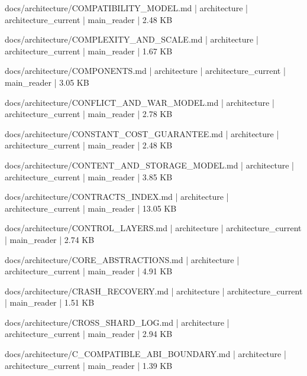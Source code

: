 \documentclass[11pt,a4paper]{report}
\begin{document}
{\small\ttfamily\raggedright docs/\allowbreak{}architecture/\allowbreak{}COMPATIBILITY\_MODEL.\allowbreak{}md | architecture | architecture\_current | main\_reader | 2.\allowbreak{}48 KB\par}
{\small\ttfamily\raggedright docs/\allowbreak{}architecture/\allowbreak{}COMPLEXITY\_AND\_SCALE.\allowbreak{}md | architecture | architecture\_current | main\_reader | 1.\allowbreak{}67 KB\par}
{\small\ttfamily\raggedright docs/\allowbreak{}architecture/\allowbreak{}COMPONENTS.\allowbreak{}md | architecture | architecture\_current | main\_reader | 3.\allowbreak{}05 KB\par}
{\small\ttfamily\raggedright docs/\allowbreak{}architecture/\allowbreak{}CONFLICT\_AND\_WAR\_MODEL.\allowbreak{}md | architecture | architecture\_current | main\_reader | 2.\allowbreak{}78 KB\par}
{\small\ttfamily\raggedright docs/\allowbreak{}architecture/\allowbreak{}CONSTANT\_COST\_GUARANTEE.\allowbreak{}md | architecture | architecture\_current | main\_reader | 2.\allowbreak{}48 KB\par}
{\small\ttfamily\raggedright docs/\allowbreak{}architecture/\allowbreak{}CONTENT\_AND\_STORAGE\_MODEL.\allowbreak{}md | architecture | architecture\_current | main\_reader | 3.\allowbreak{}85 KB\par}
{\small\ttfamily\raggedright docs/\allowbreak{}architecture/\allowbreak{}CONTRACTS\_INDEX.\allowbreak{}md | architecture | architecture\_current | main\_reader | 13.\allowbreak{}05 KB\par}
{\small\ttfamily\raggedright docs/\allowbreak{}architecture/\allowbreak{}CONTROL\_LAYERS.\allowbreak{}md | architecture | architecture\_current | main\_reader | 2.\allowbreak{}74 KB\par}
{\small\ttfamily\raggedright docs/\allowbreak{}architecture/\allowbreak{}CORE\_ABSTRACTIONS.\allowbreak{}md | architecture | architecture\_current | main\_reader | 4.\allowbreak{}91 KB\par}
{\small\ttfamily\raggedright docs/\allowbreak{}architecture/\allowbreak{}CRASH\_RECOVERY.\allowbreak{}md | architecture | architecture\_current | main\_reader | 1.\allowbreak{}51 KB\par}
{\small\ttfamily\raggedright docs/\allowbreak{}architecture/\allowbreak{}CROSS\_SHARD\_LOG.\allowbreak{}md | architecture | architecture\_current | main\_reader | 2.\allowbreak{}94 KB\par}
{\small\ttfamily\raggedright docs/\allowbreak{}architecture/\allowbreak{}C\_COMPATIBLE\_ABI\_BOUNDARY.\allowbreak{}md | architecture | architecture\_current | main\_reader | 1.\allowbreak{}39 KB\par}
\end{document}

